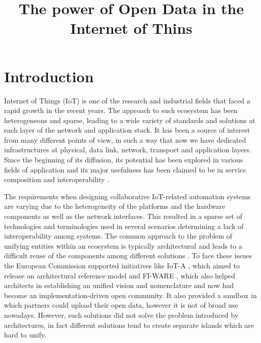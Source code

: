 \documentclass[conference]{IEEEtran}
\title{The power of Open Data in the Internet of Thins}
\author{\IEEEauthorblockN{Federico Montori, Luca Bedogni
\IEEEauthorblockA{
Department of Computer Science and Engineering (DISI)\\
University of Bologna, Italy\\
Email: \{federico.montori2, luca.bedogni4\}@unibo.it}}
}
\begin{document}
\maketitle

\begin{abstract}

\end{abstract}

\section{Introduction}
Internet of Things (IoT) is one of the research and industrial fields that faced a rapid growth in the recent years.
The approach to such ecosystem has been heterogeneous and sparse, leading to a wide variety of standards and solutions at each layer of the network and application stack.
It has been a source of interest from many different points of view, in such a way that now we have dedicated infrastructures at physical, data link, network, transport and application layers.
\\

Since the beginning of its diffusion, its potential has been explored in various fields of application and its major usefulness has been claimed to be in service composition and interoperability \cite{atzori2010internet}.

The requirements when designing collaborative IoT-related automation systems are varying due to the heterogeneity of the platforms and the hardware components as well as the network interfaces.
This resulted in a sparse set of technologies and terminologies used in several scenarios determining a lack of interoperability among systems.
The common approach to the problem of unifying entities within an ecosystem is typically architectural and leads to a difficult reuse of the components among different solutions \cite{krco2014designing}.
To face these issues the European Commission supported initiatives like IoT-A \cite{iot-a}, which aimed to release an architectural reference model and FI-WARE \cite{fiware}, which also helped architects in establishing an unified vision and nomenclature and now had become an implementation-driven open community.
It also provided a sandbox in which partners could upload their open data, however it is not of broad use nowadays.
However, such solutions did not solve the problem introduced by architectures, in fact different solutions tend to create separate islands which are hard to unify.
\\
\end{document}
